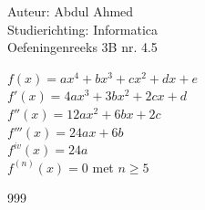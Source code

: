 \documentclass[a4paper]{article}
\begin{document}
  
\noindent \large Auteur: Abdul Ahmed \\
\noindent \large Studierichting: Informatica\\
\noindent \large Oefeningenreeks 3B nr. 4.5\\

\medskip

\normalsize

$f(x) = ax^4 + bx^3 + cx^2 +dx + e$\\

$f'(x) = 4ax^3 + 3bx^2 + 2cx +d$\\

$f''(x) = 12ax^2 + 6bx + 2c$\\

$f'''(x) = 24ax + 6b$\\

$f^{iv}(x) = 24a$\\

$f^{(n)}(x) = 0$ met $n \geq 5$\\


\begin{thebibliography}{999}
\end{thebibliography}
\end{document}
